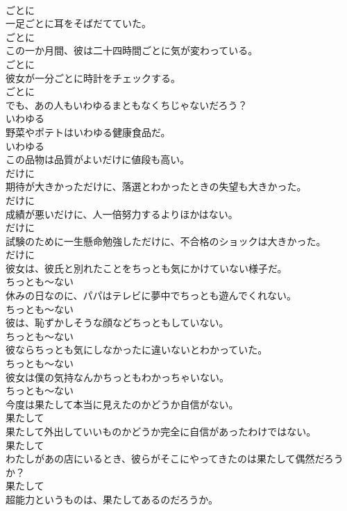 \documentclass[8pt]{extreport}
\begin{document}
\begin{CJK}{UTF8}{min}
\\	ごとに
\\	一足ごとに耳をそばだてていた。	
\\	ごとに
\\	この一か月間、彼は二十四時間ごとに気が変わっている。	
\\	ごとに
\\	彼女が一分ごとに時計をチェックする。	
\\	ごとに
\\	でも、あの人もいわゆるまともなくちじゃないだろう？	
\\	いわゆる
\\	野菜やポテトはいわゆる健康食品だ。	
\\	いわゆる
\\	この品物は品質がよいだけに値段も高い。	
\\	だけに
\\	期待が大きかっただけに、落選とわかったときの失望も大きかった。	
\\	だけに
\\	成績が悪いだけに、人一倍努力するよりほかはない。	
\\	だけに
\\	試験のために一生懸命勉強しただけに、不合格のショックは大きかった。	
\\	だけに
\\	彼女は、彼氏と別れたことをちっとも気にかけていない様子だ。	
\\	ちっとも～ない
\\	休みの日なのに、パパはテレビに夢中でちっとも遊んでくれない。	
\\	ちっとも～ない
\\	彼は、恥ずかしそうな顔などちっともしていない。	
\\	ちっとも～ない
\\	彼ならちっとも気にしなかったに違いないとわかっていた。	
\\	ちっとも～ない
\\	彼女は僕の気持なんかちっともわかっちゃいない。	
\\	ちっとも～ない
\\	今度は果たして本当に見えたのかどうか自信がない。	
\\	果たして
\\	果たして外出していいものかどうか完全に自信があったわけではない。	
\\	果たして
\\	わたしがあの店にいるとき、彼らがそこにやってきたのは果たして偶然だろうか？	
\\	果たして
\\	超能力というものは、果たしてあるのだろうか。	

\end{CJK}
\end{document}
